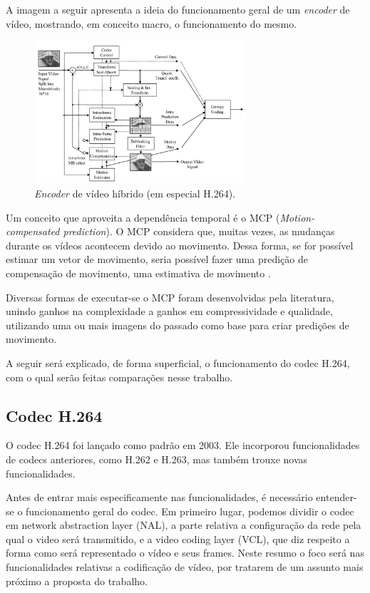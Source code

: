 \documentclass[cic,tc]{iiufrgs}
\begin{document}
A imagem a seguir apresenta a ideia do funcionamento geral de um \textit{encoder} de vídeo,
mostrando, em conceito macro, o funcionamento do mesmo.
\begin{figure}[H]
    \caption{\textit{Encoder} de vídeo híbrido (em especial H.264).}
    \begin{center}
        \includegraphics[width=0.7\textwidth]{img/HybridCodec.png}
    \end{center}
\end{figure}

Um conceito que aproveita a dependência temporal é o MCP (\textit{Motion-compensated prediction}).
O MCP considera que, muitas vezes, as mudanças durante os vídeos acontecem devido ao movimento.
Dessa forma, se for possível estimar um vetor de movimento, seria possível fazer uma predição
de compensação de movimento, uma estimativa de movimento \cite{SullivanH264}. 

Diversas formas de executar-se o MCP foram desenvolvidas pela literatura, unindo ganhos
na complexidade a ganhos em compressividade e qualidade, utilizando uma ou mais imagens 
do passado como base para criar predições de movimento.

A seguir será explicado, de forma superficial, o funcionamento do codec H.264, com o qual 
serão feitas comparações nesse trabalho.

\subsection{Codec H.264}
O codec H.264 foi lançado como padrão em 2003.
Ele incorporou funcionalidades de codecs anteriores, como H.262 e H.263, mas também
trouxe novas funcionalidades.

Antes de entrar mais especificamente nas funcionalidades, é necessário entender-se o 
funcionamento geral do codec.
Em primeiro lugar, podemos dividir o codec em network abstraction layer (NAL), a parte
relativa a configuração da rede pela qual o video será transmitido,
e a video coding layer (VCL), que diz respeito a forma como será representado o vídeo 
e seus frames.
Neste resumo o foco será nas funcionalidades relativas a codificação de vídeo, 
por tratarem de um assunto mais próximo a proposta do trabalho.
\end{document}
